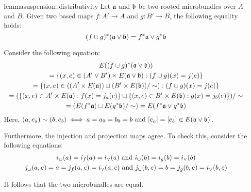 \begin{mystatement}{lemma}{suspension::distributivity}
    Let $\mathfrak{a}$ and $\bb$ be two rooted microbundles over $A$ and $B$.
    Given two based maps $f: A' \to A$ and $g: B' \to B$,
    the following equality holds:
    \[ \ind{(f \cup g)}(\ba \vee \bb) = \ind{f}\ba \vee \ind{g}\bb \]
\end{mystatement}

\begin{myproof}
    Consider the following equation:
    \begin{gather*}
        E(\ind{(f \cup g)}(\ba \vee \bb)) \\
        = \set{(x, e) \in (A' \vee B') \cross E(\ba \vee \bb)}{(f \cup g)(x) = j(e)} \\
        = \set{(x, e) \in ((A' \cross E(\ba)) \sqcup (B' \cross E(\bb)) / \sim)}{(f \cup g)(x) = j(e)} \\
        = (\set{(x, e) \in A' \cross E(\ba)}{f(x) = j_a(e)} \sqcup \set{(x, e) \in B' \cross E(\bb)}{g(x) = j_b(e)}) / \sim \\
        = (E(\ind{f}\ba) \sqcup E(\ind{g}\bb) / \sim)
        = E(\ind{f}\ba \vee \ind{g}\bb)
    \end{gather*}
    Here, $(a, e_a) \sim (b, e_b) \iff a = a_0 = b_0 = b \tand [e_a] = [e_b] \in E(\ba \vee \bb)$.

    Furthermore, the injection and projection maps agree.
    To check this, consider the following equations:
    \begin{gather}
        i_{\cup}(a) = i_f(a) = i_{\vee}(a) \text{ and } i_{\cup}(b) = i_g(b) = i_{\vee}(b)\\
        j_{\cup}(a, e) = a = j_f(a, e) = i_{\vee}(a, e) \text{ and } j_{\cup}(b, e) = b = j_g(b, e) = i_{\vee}(b, e)
    \end{gather}

    It follows that the two microbundles are equal.
\end{myproof}